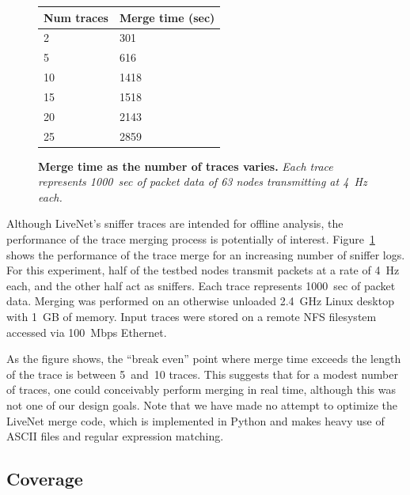\begin{figure}[t]
\begin{center}
\begin{small}
\begin{tabular}{|l|l|} \hline
{\bf Num traces} & {\bf Merge time (sec)} \\ \hline
2		 & 301 \\ \hline
5		 & 616 \\ \hline
10	         & 1418 \\ \hline
15		 & 1518 \\ \hline
20		 & 2143 \\ \hline
25		 & 2859 \\ \hline
\end{tabular}
\end{small}
\end{center}
\caption{\small {\bf Merge time as the number of traces varies.}
{\em Each trace represents 1000~sec of packet data of 63 nodes transmitting at 4~Hz each.}}
\label{fig-merge-timing}
\end{figure}

Although LiveNet's sniffer traces are intended for offline analysis,
the performance of the trace merging process is potentially of
interest. Figure~\ref{fig-merge-timing} shows the performance of the
trace merge for an increasing number of sniffer logs. For 
this experiment, half of the testbed nodes transmit packets at 
a rate of 4~Hz each, and the other half act as sniffers.
Each trace represents 1000~sec of packet data. Merging was performed
on an otherwise unloaded 2.4~GHz Linux desktop with 1~GB of memory. 
Input traces were stored on a remote NFS filesystem accessed via
100~Mbps Ethernet. 

As the figure shows, the ``break even'' point where merge time exceeds
the length of the trace is between 5~and~10 traces.  This suggests that
for a modest number of traces, one could conceivably perform merging
in real time, although this was not one of our design goals. Note that
we have made no attempt to optimize the LiveNet merge code, which is
implemented in Python and makes heavy use of ASCII files and regular
expression matching.

\subsection{Coverage}

